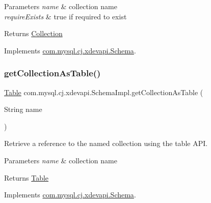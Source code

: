 \begin{DoxyParams}{Parameters}
{\em name} & collection name \\
\hline
{\em require\+Exists} & true if required to exist \\
\hline
\end{DoxyParams}
\begin{DoxyReturn}{Returns}
\mbox{\hyperlink{interfacecom_1_1mysql_1_1cj_1_1xdevapi_1_1_collection}{Collection}} 
\end{DoxyReturn}


Implements \mbox{\hyperlink{interfacecom_1_1mysql_1_1cj_1_1xdevapi_1_1_schema_a6c7616f0106d2b05c75ed9e58238f0cf}{com.\+mysql.\+cj.\+xdevapi.\+Schema}}.

\mbox{\label{classcom_1_1mysql_1_1cj_1_1xdevapi_1_1_schema_impl_a8382999acc577f81226c60bfa015a8a9}} 
\subsubsection{\texorpdfstring{get\+Collection\+As\+Table()}{getCollectionAsTable()}}
{\footnotesize\ttfamily \mbox{\hyperlink{interfacecom_1_1mysql_1_1cj_1_1xdevapi_1_1_table}{Table}} com.\+mysql.\+cj.\+xdevapi.\+Schema\+Impl.\+get\+Collection\+As\+Table (\begin{DoxyParamCaption}\item[{String}]{name }\end{DoxyParamCaption})}

Retrieve a reference to the named collection using the table A\+PI.


\begin{DoxyParams}{Parameters}
{\em name} & collection name \\
\hline
\end{DoxyParams}
\begin{DoxyReturn}{Returns}
\mbox{\hyperlink{interfacecom_1_1mysql_1_1cj_1_1xdevapi_1_1_table}{Table}} 
\end{DoxyReturn}


Implements \mbox{\hyperlink{interfacecom_1_1mysql_1_1cj_1_1xdevapi_1_1_schema_adaa1920ec971a87acc1173ba0c56f92e}{com.\+mysql.\+cj.\+xdevapi.\+Schema}}.

